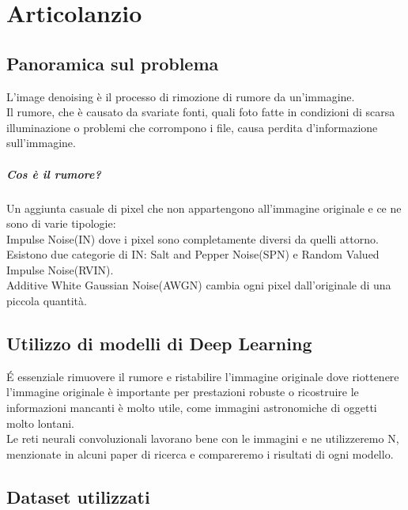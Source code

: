 \documentclass[12pt,a4paper,openright,twoside]{book}
\begin{document}
\titleformat{\chapter}{\normalfont\huge \bfseries}{\Huge \thechapter}{20pt}{\Huge}
\tableofcontents

\chapter{Articolanzio}
\section{Panoramica sul problema}
L'image denoising è il processo di rimozione di rumore da un'immagine.\\
Il rumore, che è causato da svariate fonti, quali foto fatte in condizioni di scarsa illuminazione o problemi che corrompono i file, causa perdita d'informazione sull'immagine.
\paragraph{Cos è il rumore?} 
Un aggiunta casuale di pixel che non appartengono all'immagine originale e ce ne sono di varie tipologie:\\
Impulse Noise(IN) dove i pixel sono completamente diversi da quelli attorno. Esistono due categorie di IN: Salt and Pepper Noise(SPN) e Random Valued Impulse Noise(RVIN).\\
Additive White Gaussian Noise(AWGN) cambia ogni pixel dall'originale di una piccola quantità.\\

\section{Utilizzo di modelli di Deep Learning}
\'E essenziale rimuovere il rumore e ristabilire l'immagine originale dove 
riottenere l'immagine originale è importante per prestazioni robuste o ricostruire le informazioni mancanti è molto utile, come immagini astronomiche di oggetti molto lontani.\\
Le reti neurali convoluzionali lavorano bene con le immagini e ne utilizzeremo N, menzionate in alcuni paper di ricerca e compareremo i risultati di ogni modello.\\
\section{Dataset utilizzati}
\end{document}
